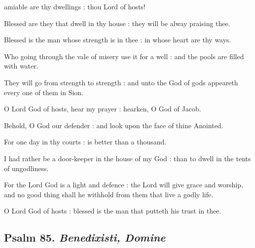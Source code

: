  amiable are thy dwellings : thou Lord of hosts!\par
{}
Blessed are they that dwell in thy house : they will be alway praising thee.\par
{}Blessed is the man whose strength is in thee : in whose heart are thy ways.\par
{}Who going through the vale of misery use it for a well : and the pools are filled with water.\par
{}They will go from strength to strength : and unto the God of gods appeareth every one of them in Sion.\par
{}O Lord God of hosts, hear my prayer : hearken, O God of Jacob.\par
{}Behold, O God our defender : and look upon the face of thine Anointed.\par
{}For one day in thy courts : is better than a thousand.\par
{}I had rather be a door-keeper in the house of my God : than to dwell in the tents of ungodliness.\par
{}For the Lord God is a light and defence : the Lord will give grace and worship, and no good thing shall he withhold from them that live a godly life.\par
{}O Lord God of hosts : blessed is the man that putteth his trust in thee.\par

\subsection{Psalm 85. \textit{Benedixisti, Domine}}

